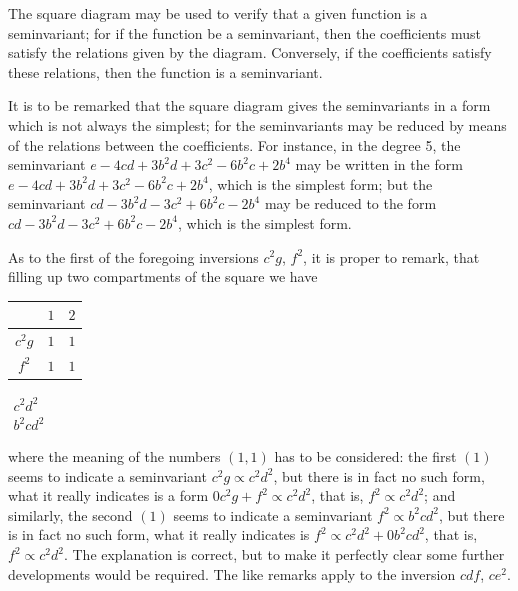 \documentclass[11pt,a4paper]{book}
\begin{document}
{{{\setcounter{art}{45}
\begin{art}
The square diagram may be used to verify that a given function is a seminvariant; for if the function be a seminvariant, then the coefficients must satisfy the relations given by the diagram. Conversely, if the coefficients satisfy these relations, then the function is a seminvariant.
\end{art}

\setcounter{art}{46}
\begin{art}
It is to be remarked that the square diagram gives the seminvariants in a form which is not always the simplest; for the seminvariants may be reduced by means of the relations between the coefficients. For instance, in the degree 5, the seminvariant $e - 4cd + 3b^{2}d + 3c^{2} - 6b^{2}c + 2b^{4}$ may be written in the form $e - 4cd + 3b^{2}d + 3c^{2} - 6b^{2}c + 2b^{4}$, which is the simplest form; but the seminvariant $cd - 3b^{2}d - 3c^{2} + 6b^{2}c - 2b^{4}$ may be reduced to the form $cd - 3b^{2}d - 3c^{2} + 6b^{2}c - 2b^{4}$, which is the simplest form.
\end{art}

\setcounter{art}{47}
\begin{art}
As to the first of the foregoing inversions $c^{2}g$, $f^{2}$, it is proper to remark, that filling up two compartments of the square we have
\begin{center}
\begin{tabular}{c|cc}
 & $1$ & $2$ \\
\hline
$c^{2}g$ & $1$ & $1$ \\
$f^{2}$ & $1$ & $1$ \\
\end{tabular}
\quad
$\begin{array}{c}c^{2}d^{2}\\ b^{2}cd^{2}\end{array}$
\end{center}
where the meaning of the numbers $(1, 1)$ has to be considered: the first $(1)$ seems to indicate a seminvariant $c^{2}g \propto c^{2}d^{2}$, but there is in fact no such form, what it really indicates is a form $0c^{2}g + f^{2} \propto c^{2}d^{2}$, that is, $f^{2} \propto c^{2}d^{2}$; and similarly, the second $(1)$ seems to indicate a seminvariant $f^{2} \propto b^{2}cd^{2}$, but there is in fact no such form, what it really indicates is $f^{2} \propto c^{2}d^{2} + 0b^{2}cd^{2}$, that is, $f^{2} \propto c^{2}d^{2}$. The explanation is correct, but to make it perfectly clear some further developments would be required. The like remarks apply to the inversion $cdf$, $ce^{2}$.
\end{art}

}}}
\end{document}
